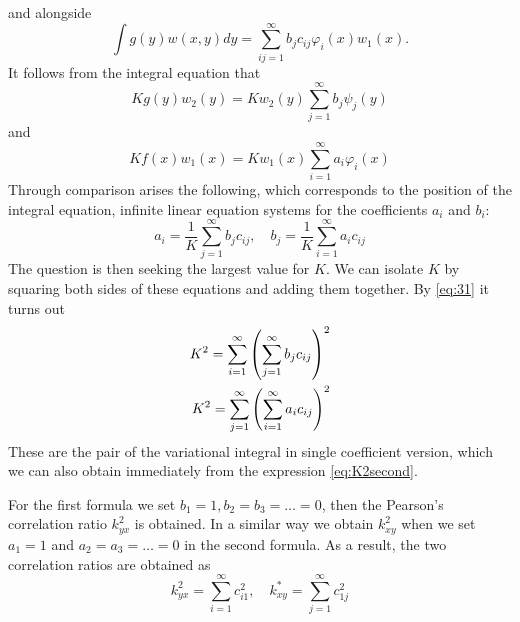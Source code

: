 \documentclass{article}
\begin{document}
and alongside
$$
\int g(y) w(x, y) d y=\sum_{i j=1}^{\infty} b_{j} c_{i j} \varphi_{i}(x) w_{1}(x).
$$
It follows from the integral equation that 
$$
K  g(y) w_{2}(y)=K w_{2}(y) \sum_{j=1}^{\infty} b_{j} \psi_{j}(y)
$$
and
$$
K f(x) w_{1}(x)=K w_{1}(x) \sum_{i=1}^{\infty} a_{i} \varphi_{i}(x)
$$
Through comparison arises the following, which corresponds to the position of the integral equation,
infinite linear equation systems for the coefficients $a_i$
and $b_i$:
$$
a_{i}=\frac{1}{K} \sum_{j=1}^{\infty} b_{j} c_{i j}, \quad b_{j}=\frac{1}{K} \sum_{i=1}^{\infty} a_{i} c_{i j}
$$
The question is then seeking the largest value for $K$.
We can isolate $K$ by squaring both sides of these equations
and adding them together. By \eqref{eq:31} it turns out
\begin{align}
K^{2}=\sum_{i=1}^{\infty}\left(\sum_{j=1}^{\infty} b_{j} c_{i j}\right)^{2} \notag\\
K^{2}=\sum_{j=1}^{\infty}\left(\sum_{i=1}^{\infty} a_{i} c_{i j}\right)^{2}
\end{align}
These are the pair of the variational integral in single coefficient version, which we can also obtain immediately from the expression
\eqref{eq:K2second}.

For the first formula we set $b_1=1, b_2=b_3=\dots=0$,
then the Pearson's correlation ratio $k^2_{yx}$ is obtained.
In a similar way we obtain $k^2_{xy}$ when we set
$a_1=1$ and $a_2=a_3=\dots=0$ in the second formula. As
a result, the two correlation ratios are obtained as
\begin{equation}
    k_{y x}^{2}=\sum_{i=1}^{\infty} c_{i 1}^{2}, \quad k_{x y}^{*}=\sum_{j=1}^{\infty} c_{1 j}^{2}
\end{equation}
\end{document}
